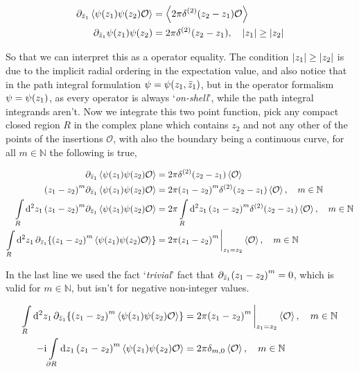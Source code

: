 \begin{align*}
    \partial_{{\bar z}_1}\expval{\psi\qty(z_1)\psi\qty(z_2)\mathcal O}&=\expval{2\pi\delta^{\qty(2)}\qty(z_2-z_1)\mathcal O}\\
    \partial_{{\bar z}_1}\psi\qty(z_1)\psi\qty(z_2)&=2\pi\delta^{\qty(2)}\qty(z_2-z_1),\ \ \ \abs{z_1}\geq\abs{z_2}
\end{align*}

So that we can interpret this as a operator equality. The condition $\abs{z_1}\geq \abs{z_2}$ is due to the implicit radial ordering in the expectation 
value, and also notice that in the path integral formulation $\psi=\psi\qty(z_1,{\bar z}_1)$, but in the operator formalism $\psi=\psi\qty(z_1)$, as every operator is 
always `\textit{on-shell}', while the path integral integrands aren't. Now we integrate this two point function, pick any compact closed region $R$ in the complex plane which 
contains $z_2$ and not any other of the points of the insertions $\mathcal O$, with also the boundary being a continuous curve, for all $m\in\mathbb N$ the following is true,

\begin{align*}
    \partial_{{\bar z}_1}\expval{\psi\qty(z_1)\psi\qty(z_2)\mathcal O}&=2\pi\delta^{\qty(2)}\qty(z_2-z_1)\expval{\mathcal O}\\
    \qty(z_1-z_2)^m\partial_{{\bar z}_1}\expval{\psi\qty(z_1)\psi\qty(z_2)\mathcal O}&=2\pi\qty(z_1-z_2)^m\delta^{\qty(2)}\qty(z_2-z_1)\expval{\mathcal O},\ \ \ m\in\mathbb N\\
    \int\limits_R\dd[2]{z_1}\qty(z_1-z_2)^m\partial_{{\bar z}_1}\expval{\psi\qty(z_1)\psi\qty(z_2)\mathcal O}&=2\pi\int\limits_R\dd[2]{z_1}\qty(z_1-z_2)^m\delta^{\qty(2)}\qty(z_2-z_1)\expval{\mathcal O},\ \ \ m\in\mathbb N\\
    \int\limits_R\dd[2]{z_1}\partial_{{\bar z}_1}\qty{\qty(z_1-z_2)^m\expval{\psi\qty(z_1)\psi\qty(z_2)\mathcal O}}&=2\pi\qty(z_1-z_2)^m\eval_{z_1=z_2}\expval{\mathcal O},\ \ \ m\in\mathbb N
\end{align*}

In the last line we used the fact `\textit{trivial}' fact that $\partial_{{\bar z}_1}\qty(z_1-z_2)^m=0$, which is valid for $m\in\mathbb N$, but isn't for 
negative non-integer values.

\begin{align*}
    \int\limits_R\dd[2]{z_1}\partial_{{\bar z}_1}\qty{\qty(z_1-z_2)^m\expval{\psi\qty(z_1)\psi\qty(z_2)\mathcal O}}&=2\pi\qty(z_1-z_2)^m\eval_{z_1=z_2}\expval{\mathcal O},\ \ \ m\in\mathbb N\\
    -\im\int\limits_{\partial R}\dd{z_1}\qty(z_1-z_2)^m\expval{\psi\qty(z_1)\psi\qty(z_2)\mathcal O}&=2\pi\delta_{m,0}\expval{\mathcal O},\ \ \ m\in\mathbb N
\end{align*}

